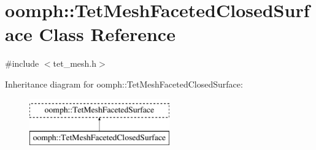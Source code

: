 \hypertarget{classoomph_1_1TetMeshFacetedClosedSurface}{}\section{oomph\+:\+:Tet\+Mesh\+Faceted\+Closed\+Surface Class Reference}
\label{classoomph_1_1TetMeshFacetedClosedSurface}


{\ttfamily \#include $<$tet\+\_\+mesh.\+h$>$}

Inheritance diagram for oomph\+:\+:Tet\+Mesh\+Faceted\+Closed\+Surface\+:\begin{figure}[H]
\begin{center}
\leavevmode
\includegraphics[height=2.000000cm]{classoomph_1_1TetMeshFacetedClosedSurface}
\end{center}
\end{figure}
